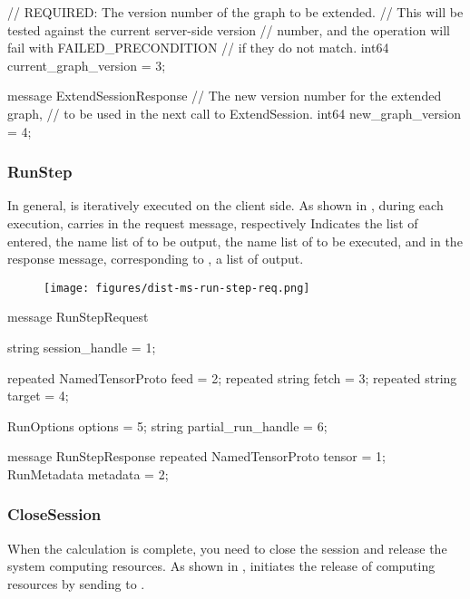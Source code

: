 \begin{content}
\begin{leftbar}
\begin{c++}
{  // REQUIRED: The version number of the graph to be extended. 
  // This will be tested against the current server-side version 
  // number, and the operation will fail with FAILED\_PRECONDITION 
  // if they do not match.
  int64 current_graph_version = 3;
}

message ExtendSessionResponse {
  // The new version number for the extended graph, 
  // to be used in the next call to ExtendSession.
  int64 new_graph_version = 4;
}
\end{c++}
\end{leftbar}

\subsubsection{RunStep}
In general,  is iteratively executed on the client side. As shown in , during each  execution,  carries  in the request message, respectively Indicates the list of  entered, the name list of  to be output, the name list of  to be executed, and  in the response message, corresponding to , a list of  output.

\begin{figure}[H]
  \centering
  \texttt{[image: figures/dist-ms-run-step-req.png]}
  \caption{}
  \label{fig:dist-ms-run-step-req}
\end{figure}

\begin{leftbar}
\begin{c++}
message RunStepRequest {
  string session_handle = 1;

  repeated NamedTensorProto feed = 2;
  repeated string fetch = 3;
  repeated string target = 4;

  RunOptions options = 5;
  string partial_run_handle = 6;
}

message RunStepResponse {
  repeated NamedTensorProto tensor = 1;
  RunMetadata metadata = 2;
}
\end{c++}
\end{leftbar}


\subsubsection{CloseSession}
When the calculation is complete, you need to close the session and release the system computing resources. As shown in ,  initiates the release of computing resources by sending  to .


\end{content}
